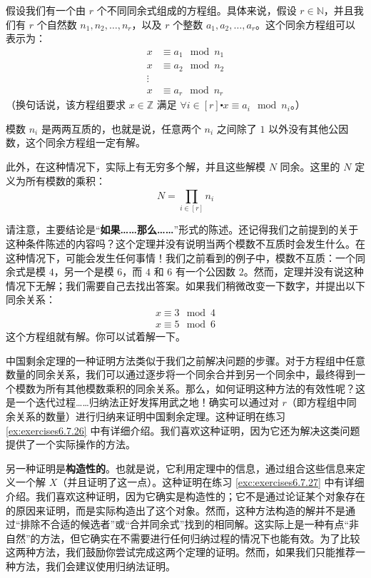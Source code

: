 \begin{theorem}
    假设我们有一个由 $r$ 个不同同余式组成的方程组。具体来说，假设 $r \in \mathbb{N}$，并且我们有 $r$ 个自然数 $n_1, n_2, \dots, n_r$，以及 $r$ 个整数 $a_1, a_2, \dots, a_r$。这个同余方程组可以表示为：
    \begin{align*}
        x &\equiv a_1 \mod n_1 \\
        x &\equiv a_2 \mod n_2 \\
        \vdots \\
        x &\equiv a_r \mod n_r
    \end{align*}
    （换句话说，该方程组要求 $x \in \mathbb{Z}$ 满足 $\forall i \in [r] \centerdot x \equiv a_i \mod n_i$。）

    模数 $n_i$ 是两两互质的，也就是说，任意两个 $n_i$ 之间除了 $1$ 以外没有其他公因数，这个同余方程组一定有解。

    此外，在这种情况下，实际上有无穷多个解，并且这些解模 $N$ 同余。这里的 $N$ 定义为所有模数的乘积：
    \[N = \prod_{i \in [r]}^{} n_i\]
\end{theorem}

请注意，主要结论是``\textbf{如果……那么……}''形式的陈述。还记得我们之前提到的关于这种条件陈述的内容吗？这个定理并没有说明当两个模数不互质时会发生什么。在这种情况下，可能会发生任何事情！我们之前看到的例子中，模数不互质：一个同余式是模 $4$，另一个是模 $6$，而 $4$ 和 $6$ 有一个公因数 $2$。然而，定理并没有说这种情况下无解；我们需要自己去找出答案。如果我们稍微改变一下数字，并提出以下同余关系：
\begin{align*}
    x \equiv 3 \mod 4 \\
    x \equiv 5 \mod 6
\end{align*}
这个方程组就有解。你可以试着解一下。

中国剩余定理的一种证明方法类似于我们之前解决问题的步骤。对于方程组中任意数量的同余关系，我们可以通过逐步将一个同余合并到另一个同余中，最终得到一个模数为所有其他模数乘积的同余关系。那么，如何证明这种方法的有效性呢？这是一个迭代过程……归纳法正好发挥用武之地！确实可以通过对 $r$（即方程组中同余关系的数量）进行归纳来证明中国剩余定理。这种证明在练习 \ref{ex:exercises6.7.26} 中有详细介绍。我们喜欢这种证明，因为它还为解决这类问题提供了一个实际操作的方法。

另一种证明是\textbf{构造性的}。也就是说，它利用定理中的信息，通过组合这些信息来定义一个解 $X$（并且证明了这一点）。这种证明在练习 \ref{exc:exercises6.7.27} 中有详细介绍。我们喜欢这种证明，因为它确实是构造性的；它不是通过论证某个对象存在的原因来证明，而是实际构造出了这个对象。然而，这种方法构造的解并不是通过``排除不合适的候选者''或``合并同余式''找到的相同解。这实际上是一种有点``非自然''的方法，但它确实在不需要进行任何归纳过程的情况下也能有效。为了比较这两种方法，我们鼓励你尝试完成这两个定理的证明。然而，如果我们只能推荐一种方法，我们会建议使用归纳法证明。

